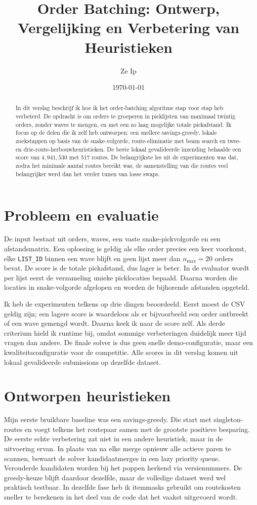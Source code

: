 \documentclass[a4paper,11pt]{article}
\title{Order Batching: Ontwerp, Vergelijking en Verbetering van Heuristieken}
\author{Ze Ip}
\date{\today}
\begin{document}
\maketitle

\begin{abstract}
In dit verslag beschrijf ik hoe ik het order-batching algoritme stap voor stap heb verbeterd. De opdracht is om orders te groeperen in picklijsten van maximaal twintig orders, zonder waves te mengen, en met een zo laag mogelijke totale pickafstand. Ik focus op de delen die ik zelf heb ontworpen: een snellere savings-greedy, lokale zoekstappen op basis van de snake-volgorde, route-eliminatie met beam search en twee- en drie-route-herbouwheuristieken. De beste lokaal gevalideerde inzending behaalde een score van $4{,}941{,}530$ met 517 routes. De belangrijkste les uit de experimenten was dat, zodra het minimale aantal routes bereikt was, de samenstelling van die routes veel belangrijker werd dan het verder tunen van losse swaps.
\end{abstract}

\section{Probleem en evaluatie}
De input bestaat uit orders, waves, een vaste snake-pickvolgorde en een afstandsmatrix. Een oplossing is geldig als elke order precies een keer voorkomt, elke \texttt{LIST\_ID} binnen een wave blijft en geen lijst meer dan $n_{\max}=20$ orders bevat. De score is de totale pickafstand, dus lager is beter. In de evaluator wordt per lijst eerst de verzameling unieke picklocaties bepaald. Daarna worden die locaties in snake-volgorde afgelopen en worden de bijhorende afstanden opgeteld.

Ik heb de experimenten telkens op drie dingen beoordeeld. Eerst moest de CSV geldig zijn; een lagere score is waardeloos als er bijvoorbeeld een order ontbreekt of een wave gemengd wordt. Daarna keek ik naar de score zelf. Als derde criterium hield ik runtime bij, omdat sommige verbeteringen duidelijk meer tijd vragen dan andere. De finale solver is dus geen snelle demo-configuratie, maar een kwaliteitsconfiguratie voor de competitie. Alle scores in dit verslag komen uit lokaal gevalideerde submissions op dezelfde dataset.

\section{Ontworpen heuristieken}
Mijn eerste bruikbare baseline was een savings-greedy. Die start met singleton-routes en voegt telkens het routepaar samen met de grootste positieve besparing. De eerste echte verbetering zat niet in een andere heuristiek, maar in de uitvoering ervan. In plaats van na elke merge opnieuw alle actieve paren te scannen, bewaart de solver kandidaatmerges in een lazy priority queue. Verouderde kandidaten worden bij het poppen herkend via versienummers. De greedy-keuze blijft daardoor dezelfde, maar de volledige dataset werd wel praktisch testbaar. In dezelfde fase heb ik itemmasks gebruikt om routekosten sneller te berekenen in het deel van de code dat het vaakst uitgevoerd wordt.
\end{document}
